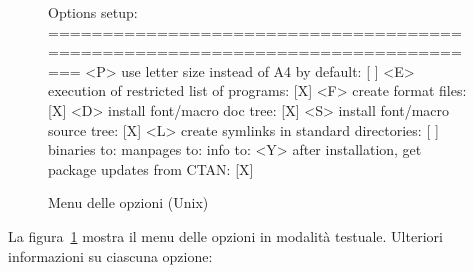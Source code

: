 \documentclass{article}
\begin{document}
\begin{figure}[tbh]
\begin{boxedverbatim}
Options setup:
===============================================================================
 <P> use letter size instead of A4 by default: [ ]
 <E> execution of restricted list of programs: [X]
 <F> create format files:                      [X]
 <D> install font/macro doc tree:              [X]
 <S> install font/macro source tree:           [X]
 <L> create symlinks in standard directories:  [ ]
            binaries to:
            manpages to:
                info to:
 <Y> after installation, get package updates from CTAN: [X]
\end{boxedverbatim}
\caption{Menu delle opzioni (Unix)}\label{fig:options-text}
\end{figure}

La figura~\ref{fig:options-text} mostra il menu delle opzioni in modalità
testuale. Ulteriori informazioni su ciascuna opzione:
\end{document}
